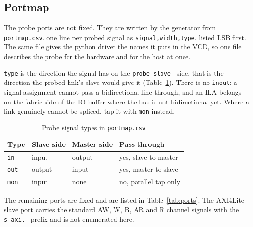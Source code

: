 \documentclass[twocolumn]{article}
\begin{document}
\subsection{Portmap}
The probe ports are not fixed. They are written by the generator from \texttt{portmap.csv}, one line per probed signal as \texttt{signal,width,type}, listed LSB first. The same file gives the python driver the names it puts in the \acs{VCD}, so one file describes the probe for the hardware and for the host at once.

\texttt{type} is the direction the signal has on the \texttt{probe\_slave\_} side, that is the direction the probed link's slave would give it (Table~\ref{tab:porttypes}). There is no \texttt{inout}: a signal assignment cannot pass a bidirectional line through, and an \acs{ILA} belongs on the fabric side of the IO buffer where the bus is not bidirectional yet. Where a link genuinely cannot be spliced, tap it with \texttt{mon} instead.

\begin{table}[h]
    \centering
    \begin{tabular}{|l|l|l|l|}
        \hline
        \rowcolor{gray!40} \textbf{Type} & \textbf{Slave side} & \textbf{Master side} & \textbf{Pass through} \\
        \hline
        \texttt{in}  & input  & output & yes, slave to master \\
        \hline
        \texttt{out} & output & input  & yes, master to slave \\
        \hline
        \texttt{mon} & input  & none   & no, parallel tap only \\
        \hline
    \end{tabular}
    \caption{Probe signal types in \texttt{portmap.csv}}
    \label{tab:porttypes}
\end{table}

The remaining ports are fixed and are listed in Table~\ref{tab:ports}. The AXI4Lite slave port carries the standard AW, W, B, AR and R channel signals with the \texttt{s\_axil\_} prefix and is not enumerated here.
\end{document}
